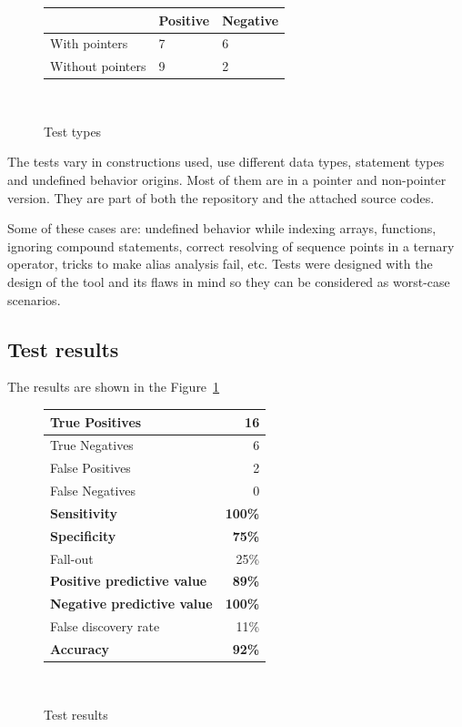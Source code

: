 \begin{figure}[h!]
\caption{Test types}
\centering
\begin{tabular}{|l|l|l|}
\hline
                 & Positive & Negative \\\hline
With pointers    & 7        & 6        \\\hline
Without pointers & 9        & 2        \\\hline
\end{tabular}\\
\end{figure}

The tests vary in constructions used, use different data types, statement types and undefined behavior origins. Most of them are in a pointer and non-pointer version. They are part of both the repository and the attached source codes.

Some of these cases are: undefined behavior while indexing arrays, functions, ignoring compound statements, correct resolving of sequence points in a ternary operator, tricks to make alias analysis fail, etc. Tests were designed with the design of the tool and its flaws in mind so they can be considered as worst-case scenarios.

\subsection{Test results}

The results are shown in the Figure~\ref{results}

\begin{figure}[h!]
\caption{Test resu\label{results}lts}
\centering
\begin{tabular}{|l|r|}
\hline
True Positives                         &             16   \\\hline
True Negatives                         &              6   \\\hline
False Positives                        &              2   \\\hline
False Negatives                        &              0   \\\hline\hline
\textbf{Sensitivity}                   & \textbf{100\%}   \\\hline
\textbf{Specificity}                   &  \textbf{75\%}   \\\hline
Fall-out                               &           25\%   \\\hline
\textbf{Positive predictive value}     &  \textbf{89\%}   \\\hline
\textbf{Negative predictive value}     & \textbf{100\%}   \\\hline
False discovery rate                   &            11\%   \\\hline\hline
\textbf{Accuracy}                      &  \textbf{92\%}   \\\hline
\end{tabular}\\
\end{figure}

